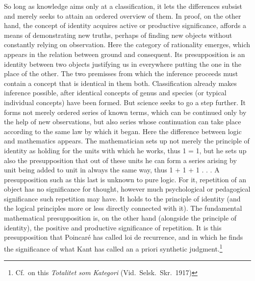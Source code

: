 \documentclass[12pt]{article}
\newcommand{\opage}[1]{\marginnote{\footnotesize\textit{[#1]}}}
\begin{document}
So long as knowledge aims only at a classification, it lets the differences
subsist and merely seeks to attain an ordered overview of them. In proof, on
the other hand, the concept of identity acquires active or productive
significance, affords a means of demonstrating new truths, perhaps of
finding new objects without constantly relying on observation. Here the
category of rationality emerges, which appears in the relation between
ground and consequent. Its presupposition is an identity between two objects
justifying us in everywhere putting the one in the place of the other. The
two premisses from which the inference proceeds must contain a concept that
is identical in them both. Classification already makes inference possible,
after identical concepts of genus and species (or typical individual
concepts) have been formed. But science seeks to go a step further. It forms
not merely ordered series of known terms, which can be continued only by the
help of new observations, but also series whose continuation can take place
according to the same law by which it began. Here the difference between
logic and mathematics appears. The mathematician sets up not merely the
principle of identity as holding for the units with which he works, thus 1 =
1, but he sets up also the presupposition that out of these units he can
form a series arising by unit being added to unit in always the same way,
thus 1 + 1 + 1 . . . A presupposition such as this last is unknown to pure
logic. For it, repetition of an object has \opage{38}no significance for thought,
however much psychological or pedagogical significance such repetition may
have. It holds to the principle of identity (and the logical principles more
or less directly connected with it). The fundamental mathematical
presupposition is, on the other hand (alongside the principle of identity),
the positive and productive significance of repetition. It is this
presupposition that Poincaré has called loi de recurrence, and in which he
finds the significance of what Kant has called an a priori synthetic
judgment.\footnote{Cf.\ on this \textit{Totalitet som Kategori} (Vid.\
Selsk.\ Skr.\ 1917)}
\end{document}
